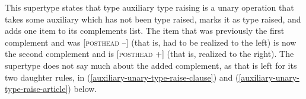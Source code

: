 \ex \label{auxiliary-unary-type-raise-super}
\xe

This supertype states that type auxiliary type raising is a unary operation that takes some auxiliary which has not been type raised, marks it as type raised, and adds one item to its complements list. The item that was previously the first complement and was [\textsc{posthead} --] (that is, had to be realized to the left) is now the second complement and is [\textsc{posthead} +] (that is, realized to the right). The supertype does not say much about the added complement, as that is left for its two daughter rules, in (\ref{auxiliary-unary-type-raise-clause}) and (\ref{auxiliary-unary-type-raise-article}) below.

\ex \label{auxiliary-unary-type-raise-clause}
\xe

